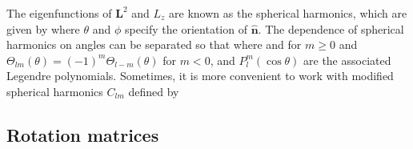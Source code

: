 The eigenfunctions of $\mathbf{L}^2$ and $L_z$ are known as the spherical harmonics, which are given by
where $\theta$ and $\phi$ specify the orientation of $\mathbf{\hat{n}}$. The dependence of spherical harmonics on 
angles can be separated so that
where
and 
for $m\ge 0$ and $\Theta_{lm}(\theta) =(-1)^{m} \Theta_{l-m}(\theta) $ for $m<0$, and $P_l^{m}(\cos\theta)$ are the 
associated Legendre polynomials. Sometimes, it is more convenient
to work with modified spherical harmonics $C_{lm}$ defined by

\subsection{Rotation matrices}

